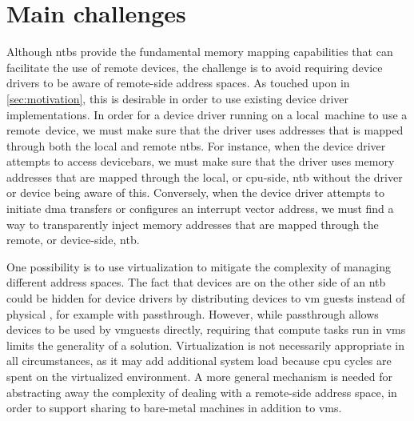 \section{Main challenges}\label{sec:challenges}
Although \glspl{ntb} provide the fundamental memory mapping capabilities that can facilitate the use of remote devices, the challenge is to avoid requiring device drivers to be aware of remote-side address spaces.
%
As touched upon in \cref{sec:motivation}, this is desirable in order to use existing device driver implementations.
%
In order for a device driver running on a local~machine to use a remote~device, we must make sure that the driver uses addresses that is mapped through both the local and remote \glspl{ntb}.
%
For instance, when the device driver attempts to access \glspl{devicebar}, we must make sure that the driver uses memory addresses that are mapped through the local, or \gls{cpu}-side, \gls{ntb} without the driver or device being aware of this.
%
Conversely, when the device driver attempts to initiate \gls{dma} transfers or configures an interrupt vector address, we must find a way to transparently inject memory addresses that are mapped through the remote, or device-side, \gls{ntb}.



One possibility is to use virtualization to mitigate the complexity of managing different address spaces.
%
The fact that devices are on the other side of an \gls{ntb} could be hidden for device drivers by distributing devices to \gls{vm} \glspl{guest} instead of physical , for example with \gls{passthrough}.
%
However, while \gls{passthrough} allows devices to be used by \glspl{vmguest} directly, requiring that compute tasks run in \glspl{vm} limits the generality of a solution.
%
Virtualization is not necessarily appropriate in all circumstances, as it may add additional system load because \gls{cpu} cycles are spent on  the virtualized environment.
%
A more general mechanism is needed for abstracting away the complexity of dealing with a remote-side address space, in order to support sharing to bare-metal machines in addition to \glspl{vm}.



